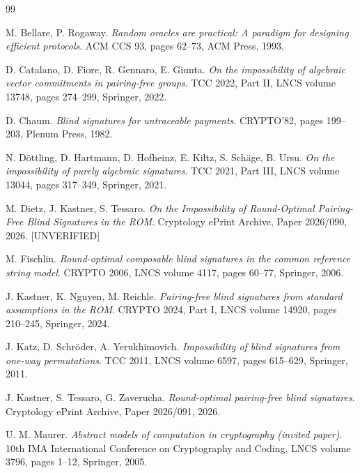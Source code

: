 \documentclass{aicr-conjecture}
\begin{document}
\begin{aicrbibliography}{99}

M. Bellare, P. Rogaway.
\emph{Random oracles are practical: A paradigm for designing efficient
protocols}.
ACM CCS 93, pages 62--73, ACM Press, 1993.

D. Catalano, D. Fiore, R. Gennaro, E. Giunta.
\emph{On the impossibility of algebraic vector commitments in
pairing-free groups}.
TCC 2022, Part II, LNCS volume 13748, pages 274--299, Springer, 2022.

D. Chaum.
\emph{Blind signatures for untraceable payments}.
CRYPTO'82, pages 199--203, Plenum Press, 1982.

N. D\"ottling, D. Hartmann, D. Hofheinz, E. Kiltz, S. Sch\"age,
B. Ursu.
\emph{On the impossibility of purely algebraic signatures}.
TCC 2021, Part III, LNCS volume 13044, pages 317--349, Springer, 2021.

M. Dietz, J. Kastner, S. Tessaro.
\emph{On the Impossibility of Round-Optimal Pairing-Free Blind
Signatures in the ROM}.
Cryptology ePrint Archive, Paper 2026/090, 2026. [UNVERIFIED]

M. Fischlin.
\emph{Round-optimal composable blind signatures in the common reference
string model}.
CRYPTO 2006, LNCS volume 4117, pages 60--77, Springer, 2006.

J. Kastner, K. Nguyen, M. Reichle.
\emph{Pairing-free blind signatures from standard assumptions in the
ROM}.
CRYPTO 2024, Part I, LNCS volume 14920, pages 210--245, Springer, 2024.

J. Katz, D. Schr\"oder, A. Yerukhimovich.
\emph{Impossibility of blind signatures from one-way permutations}.
TCC 2011, LNCS volume 6597, pages 615--629, Springer, 2011.

J. Kastner, S. Tessaro, G. Zaverucha.
\emph{Round-optimal pairing-free blind signatures}.
Cryptology ePrint Archive, Paper 2026/091, 2026.

U. M. Maurer.
\emph{Abstract models of computation in cryptography (invited paper)}.
10th IMA International Conference on Cryptography and Coding, LNCS
volume 3796, pages 1--12, Springer, 2005.

\end{aicrbibliography}
\end{document}

